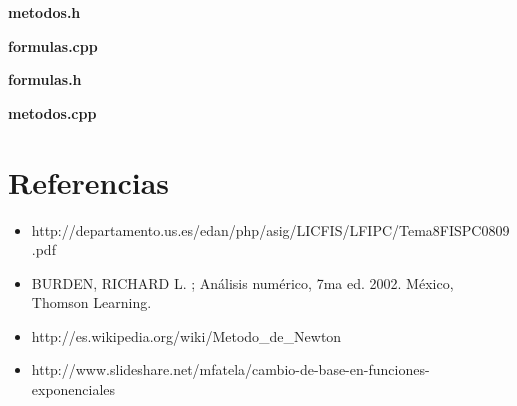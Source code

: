 \documentclass[10pt, a4paper]{article}
\begin{document}


\centerline{\large{\textbf{metodos.h}}}


\centerline{\large{\textbf{formulas.cpp}}}


\centerline{\large{\textbf{formulas.h}}}


\centerline{\large{\textbf{metodos.cpp}}}
%

\section{Referencias}


\begin{itemize}
\item{http://departamento.us.es/edan/php/asig/LICFIS/LFIPC/Tema8FISPC0809.pdf}

\item BURDEN, RICHARD L. ; An\'alisis num\'erico, 7ma ed. 2002. M\'exico, Thomson Learning.

\item http://es.wikipedia.org/wiki/Metodo\_de\_Newton

\item http://www.slideshare.net/mfatela/cambio-de-base-en-funciones-exponenciales

\end{itemize}
\end{document}
